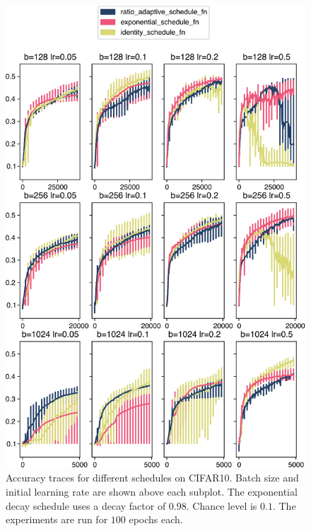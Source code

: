 \begin{figure}
    \centering
    \includegraphics[width=\linewidth]{gfx/diagrams/experiments/ratio_adaptive_accuracies.pdf}
    \caption[Accuracy traces for different schedules on CIFAR10]{Accuracy traces
    for different schedules on CIFAR10. Batch size and initial learning rate are
    shown above each subplot. The exponential decay schedule uses a decay factor of
    $0.98$. Chance level is $0.1$. The experiments are run for $100$ epochs
    each.}
    \label{fig:schedule-accuracies}
\end{figure}


